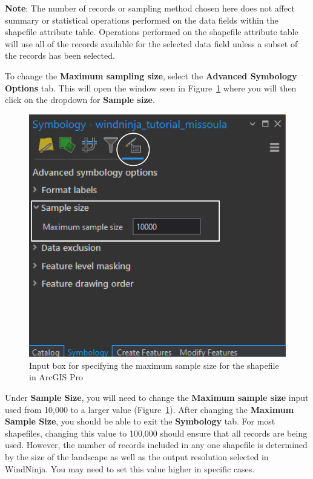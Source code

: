 \documentclass[12pt]{article}
\begin{document}
\textbf{Note}: The number of records or sampling method chosen here does not affect summary or statistical operations performed on the data fields within the shapefile attribute table. Operations performed on the shapefile attribute table will use all of the records available for the selected data field unless a subset of the records has been selected. 

To change the \textbf{Maximum sampling size}, select the \textbf{Advanced Symbology Options} tab. This will open the window seen in Figure~\ref{fig:Figure19} where you will then click on the dropdown for \textbf{Sample size}. 

\begin{figure}[H]
	\centering
	\includegraphics[scale=0.45]{arc_19.png}
	\caption{Input box for specifying the maximum sample size for the shapefile in ArcGIS Pro}
\label{fig:Figure19}
\end{figure}

Under \textbf{Sample Size}, you will need to change the \textbf{Maximum sample size} input used from 10,000 to a larger value (Figure~\ref{fig:Figure19}). After changing the \textbf{Maximum Sample Size}, you should be able to exit the \textbf{Symbology} tab. For most shapefiles, changing this value to 100,000 should ensure that all records are being used. However, the number of records included in any one shapefile is determined by the size of the landscape as well as the output resolution selected in WindNinja. You may need to set this value higher in specific cases.
\end{document}
